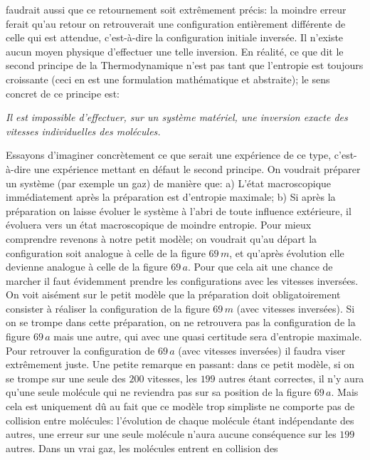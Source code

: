 faudrait aussi que ce retournement soit extr\^emement pr\'ecis: la moindre 
erreur ferait qu'au retour on retrouverait une configuration enti\`erement 
diff\'erente de celle qui est attendue, c'est-\`a-dire la configuration 
initiale invers\'ee. Il n'existe aucun moyen 
physique d'effectuer une telle inversion. En r\'ealit\'e, ce que dit
le second principe de la Thermodynamique n'est pas tant que l'entropie 
est toujours croissante (ceci en est une formulation math\'ematique et 
abstraite); le sens concret de ce principe est:
\smallskip
{\sl Il est impossible d'effectuer, sur un syst\`eme mat\'eriel, une
inversion exacte des vitesses individuelles des mol\'ecules. \par}
\medskip
Essayons d'imaginer concr\`etement ce que serait une exp\'erience
de ce type, c'est-\`a-dire une exp\'erience mettant en d\'efaut le second 
principe. On voudrait pr\'eparer un syst\`eme (par exemple un gaz) de 
mani\`ere que:
\smallskip
a) L'\'etat macroscopique imm\'ediatement apr\`es la pr\'eparation est 
d'en\-tro\-pie maximale;
\smallskip
b) Si apr\`es la pr\'eparation on laisse \'evoluer le syst\`eme \`a l'abri 
de toute influence ext\'erieure, il \'evoluera vers un \'etat macroscopique 
de moindre entropie. 
\medskip
Pour mieux comprendre revenons \`a notre petit mod\`ele; on voudrait 
qu'au d\'epart la configuration soit analogue \`a celle  de la figure 
$69\, m$, et qu'apr\`es \'evolution elle devienne analogue \`a celle  de la 
figure $69\, a$. Pour que cela ait une chance de marcher il faut 
\'evidemment prendre les configurations avec les vitesses invers\'ees.
On voit ais\'ement sur le petit mod\`ele que la pr\'eparation doit 
obligatoirement consister \`a r\'ealiser la configuration de la figure 
$69\, m$ (avec vitesses invers\'ees). Si on se trompe dans cette 
pr\'eparation, on ne retrouvera pas la configuration de la figure $69\, a$ 
mais une autre, qui avec une quasi certitude sera d'entropie maximale. 
Pour retrouver la configuration de $69\, a$ (avec vitesses invers\'ees) 
il faudra viser extr\^emement juste.  
\smallskip
Une petite remarque en passant: dans ce petit mod\`ele, 
si on se trompe sur une seule des $200$ vitesses, les $199$ autres \'etant 
correctes, il n'y aura qu'une seule mol\'ecule qui ne reviendra pas sur 
sa position de la figure $69\, a$. Mais cela est uniquement d\^u au fait 
que ce mod\`ele trop simpliste ne comporte pas de collision entre mol\'ecules:
l'\'evolution de chaque mol\'ecule \'etant ind\'ependante des autres, une 
erreur sur une seule mol\'ecule n'aura aucune cons\'equence sur les $199$ 
autres. Dans un vrai gaz, les mol\'ecules entrent en collision des 
